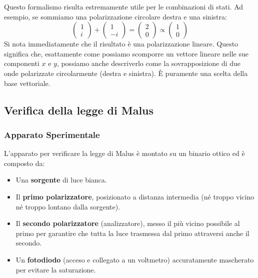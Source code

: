 \documentclass[openany,a4paper,12pt]{book}
\begin{document}
Questo formalismo risulta estremamente utile per le combinazioni di stati. Ad esempio, se sommiamo una polarizzazione circolare destra e una sinistra:
\begin{equation}
    \begin{pmatrix} 1 \\ i \end{pmatrix} + \begin{pmatrix} 1 \\ -i \end{pmatrix} = \begin{pmatrix} 2 \\ 0 \end{pmatrix} \propto \begin{pmatrix} 1 \\ 0 \end{pmatrix}
\end{equation}
Si nota immediatamente che il risultato è una polarizzazione lineare. Questo significa che, esattamente come possiamo scomporre un vettore lineare nelle sue componenti $x$ e $y$, possiamo anche descriverlo come la sovrapposizione di due onde polarizzate circolarmente (destra e sinistra). È puramente una scelta della base vettoriale.




\subsection*{Verifica della legge di Malus}

\subsubsection*{Apparato Sperimentale}
L'apparato per verificare la legge di Malus è montato su un binario ottico ed è composto da:
\begin{itemize}
    \item Una \textbf{sorgente} di luce bianca.
    \item Il \textbf{primo polarizzatore}, posizionato a distanza intermedia (né troppo vicino né troppo lontano dalla sorgente).
    \item Il \textbf{secondo polarizzatore} (analizzatore), messo il più vicino possibile al primo per garantire che tutta la luce trasmessa dal primo attraversi anche il secondo.
    \item Un \textbf{fotodiodo} (acceso e collegato a un voltmetro) accuratamente mascherato per evitare la saturazione. 
\end{itemize}
\end{document}

